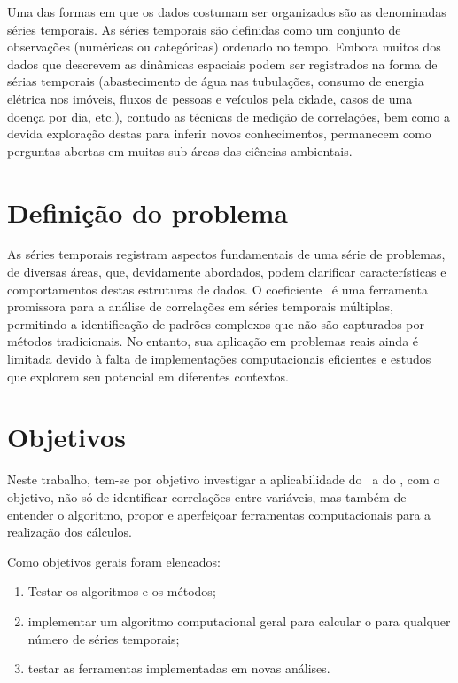 Uma das formas em que os dados costumam ser organizados são as denominadas séries temporais. As séries temporais são definidas como um conjunto de observações (numéricas ou categóricas) ordenado no tempo.  Embora muitos dos dados que descrevem as dinâmicas espaciais podem ser registrados na forma de sérias temporais (abastecimento de água nas tubulações, consumo de energia elétrica nos imóveis, fluxos de pessoas e veículos pela cidade, casos de uma doença por dia, etc.), contudo as técnicas de medição de correlações, bem como a devida exploração destas para inferir novos conhecimentos, permanecem como perguntas abertas em muitas sub-áreas das ciências ambientais\cite{Bermudez-Edo2018}.

\section{Definição do problema}
\label{sec:problema}

As séries temporais registram aspectos fundamentais de uma série de problemas, de diversas áreas, que, devidamente abordados, podem clarificar características e comportamentos destas estruturas de dados. O coeficiente \dmc~é uma ferramenta promissora para a análise de correlações em séries temporais múltiplas, permitindo a identificação de padrões complexos que não são capturados por métodos tradicionais. No entanto, sua aplicação em problemas reais ainda é limitada devido à falta de implementações computacionais eficientes e estudos que explorem seu potencial em diferentes contextos.



\section{Objetivos}
\label{sec:Objetivos}

Neste trabalho, tem-se por objetivo investigar a aplicabilidade do \pdcca~a do \dmc, com o objetivo, não só de identificar correlações entre variáveis, mas também de entender o algoritmo, propor e aperfeiçoar ferramentas computacionais para a realização dos cálculos.

Como objetivos gerais foram elencados:

\begin{enumerate}
    \label{enum:obj_espec}
    \item  Testar os algoritmos e os métodos; 
    \item implementar um algoritmo computacional geral para calcular o \dmc para qualquer número de séries temporais;
    \item testar as ferramentas implementadas em novas análises.
\end{enumerate}

